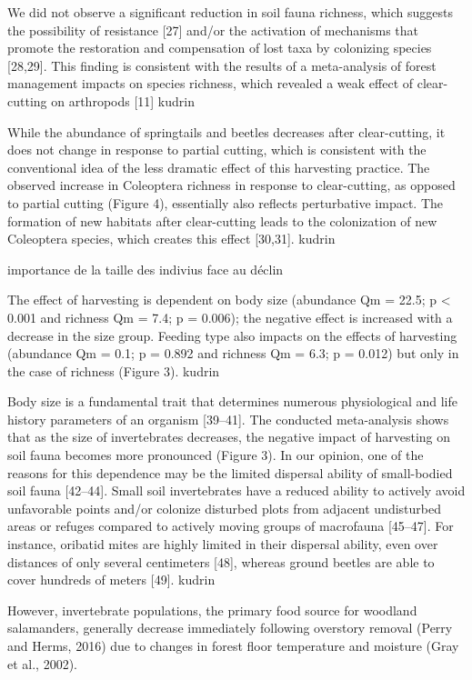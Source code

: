 We did not observe a significant reduction in soil fauna richness, which suggests the possibility of resistance [27] and/or the activation of mechanisms that promote the restoration and compensation of lost taxa by colonizing species [28,29]. This finding is consistent with the results of a meta-analysis of forest management impacts on species richness, which revealed a weak effect of clear-cutting on arthropods [11] kudrin

While the abundance of springtails and beetles decreases after clear-cutting, it does not change in response to partial cutting, which is consistent with the conventional idea of the less dramatic effect of this harvesting practice. The observed increase in Coleoptera richness in response to clear-cutting, as opposed to partial cutting (Figure 4), essentially also reflects perturbative impact. The formation of new habitats after clear-cutting leads to the colonization of new Coleoptera species, which creates this effect [30,31]. kudrin

  importance de la taille des indivius face au déclin

  The effect of harvesting is dependent on body size (abundance Qm = 22.5; p < 0.001 and richness Qm = 7.4; p = 0.006); the negative effect is increased with a decrease in the size group. Feeding type also impacts on the effects of harvesting (abundance Qm = 0.1; p = 0.892 and richness Qm = 6.3; p = 0.012) but only in the case of richness (Figure 3). kudrin

  Body size is a fundamental trait that determines numerous physiological and life history parameters of an organism [39–41]. The conducted meta-analysis shows that as the size of invertebrates decreases, the negative impact of harvesting on soil fauna becomes more pronounced (Figure 3). In our opinion, one of the reasons for this dependence may be the limited dispersal ability of small-bodied soil fauna [42–44]. Small soil invertebrates have a reduced ability to actively avoid unfavorable points and/or colonize disturbed plots from adjacent undisturbed areas or refuges compared to actively moving groups of macrofauna [45–47]. For instance, oribatid mites are highly limited in their dispersal ability, even over distances of only several centimeters [48], whereas ground beetles are able to cover hundreds of meters [49]. kudrin

However, invertebrate populations, the primary food source for woodland salamanders, generally decrease immediately following overstory removal (Perry and Herms, 2016) due to changes in forest floor temperature and moisture (Gray et al., 2002).

